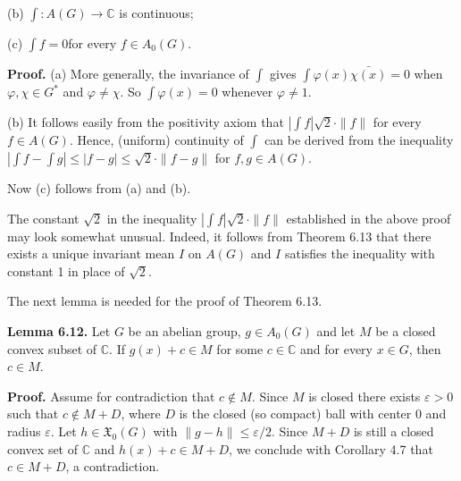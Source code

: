\documentclass[12pt]{article}
\begin{document}
(b) $\int : A(G) \to \mathbb{C}$ is continuous;

(c) $\int f = 0 $for every $f \in A_0(G)$.


\textbf{Proof.} (a) More generally, the invariance of $\int$ gives $\int \varphi(x) \bar{\chi(x)} = 0$ when $\varphi,\chi \in G^*$ and $\varphi \neq \chi$. So $\int \varphi(x) = 0$ whenever
$\varphi \neq 1$.


    (b) It follows easily from the positivity axiom that $|\int f |  \sqrt{2} \cdot \| f \|$ for every $f \in A(G)$. Hence, (uniform) continuity of $\int$
can be derived from the inequality $| \int f - \int g| \leqslant |f - g| \leqslant \sqrt{2} \cdot \| f - g\|$ for $f , g \in A(G)$.


    Now (c) follows from (a) and (b). 


The constant $\sqrt{2}$ in the inequality $|\int f |  \sqrt{2} \cdot \| f \|$ established in the above proof may look somewhat unusual. Indeed, it
follows from Theorem 6.13 that there exists a unique invariant mean $I$ on $A(G)$ and $I$ satisfies the inequality with constant 1
in place of $\sqrt{2}$.


    The next lemma is needed for the proof of Theorem 6.13.


\textbf{Lemma 6.12.} Let $G$ be an abelian group, $g \in A_0(G)$ and let $M$ be a closed convex subset of $\mathbb{C}$. If $g(x) + c \in M$ for some $c \in \mathbb{C}$ and for
every $x \in G$, then $c \in M$.


\textbf{Proof.} Assume for contradiction that $c \notin M$. Since $M$ is closed there exists $\varepsilon > 0$ such that $c \notin M + D$, where $D$ is the closed
(so compact) ball with center 0 and radius $\varepsilon$. Let $h \in \mathfrak{X}_0(G)$ with $\|g - h\| \leqslant \varepsilon/2$. Since $M + D$ is still a closed convex set
of $\mathbb{C}$ and $h(x) + c \in M + D$, we conclude with Corollary 4.7 that $c \in M + D$, a contradiction. 
\end{document}
